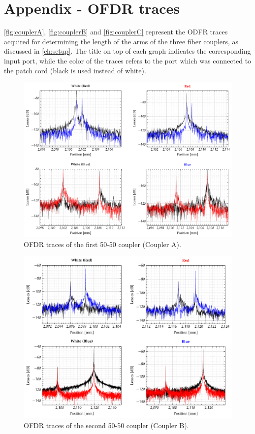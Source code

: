 
\chapter{Appendix - OFDR traces}
\label{ch:appendixA}
 \autoref{fig:couplerA}, \autoref{fig:couplerB} and \autoref{fig:couplerC} represent the ODFR traces acquired for determining the length of the arms of the three fiber couplers, as discussed in \autoref{ch:setup}. The title on top of each graph indicates the corresponding input port, while the color of the traces refers to the port which was connected to the patch cord (black is used  instead of white).
 
\begin{figure}[hbt]
	\myfloatalign
	\includegraphics[width=\linewidth]{gfx/ch3/couplers/couplerA}
	\caption{OFDR traces of the first 50-50 coupler (Coupler A).}\label{fig:couplerA}
\end{figure}

\begin{figure}[hbt]
	\myfloatalign
	\includegraphics[width=\linewidth]{gfx/ch3/couplers/couplerB}
	\caption{OFDR traces of the second 50-50 coupler (Coupler B).}\label{fig:couplerB}
\end{figure}

